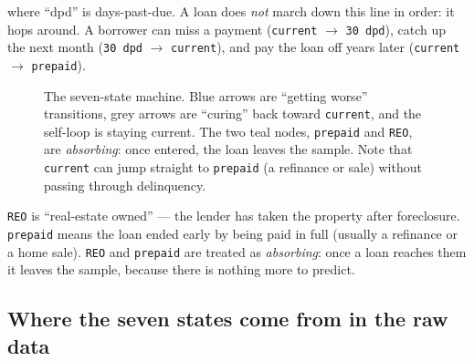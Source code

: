\documentclass[11pt]{article}
\begin{document}
where ``dpd'' is days-past-due. A loan does \emph{not} march down this line in order: it
hops around. A borrower can miss a payment (\texttt{current} $\to$ \texttt{30 dpd}),
catch up the next month (\texttt{30 dpd} $\to$ \texttt{current}), and pay the loan off
years later (\texttt{current} $\to$ \texttt{prepaid}).

\begin{figure}[H]
\centering
{}
\caption{The seven-state machine. Blue arrows are ``getting worse'' transitions, grey
arrows are ``curing'' back toward \texttt{current}, and the self-loop is staying current.
The two teal nodes, \texttt{prepaid} and \texttt{REO}, are \emph{absorbing}: once entered,
the loan leaves the sample. Note that \texttt{current} can jump straight to \texttt{prepaid}
(a refinance or sale) without passing through delinquency.}
\end{figure}

\begin{jargon}
\texttt{REO} is ``real-estate owned'' --- the lender has taken the property after
foreclosure. \texttt{prepaid} means the loan ended early by being paid in full (usually a
refinance or a home sale). \texttt{REO} and \texttt{prepaid} are treated as
\emph{absorbing}: once a loan reaches them it leaves the sample, because there is nothing
more to predict.
\end{jargon}

\subsection{Where the seven states come from in the raw data}
\end{document}
